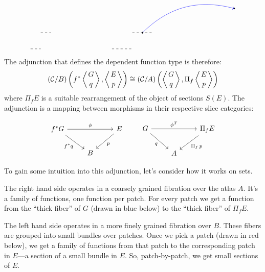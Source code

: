 \documentclass[DaoFP]{subfiles}
\begin{document}
\[\begin{tikzpicture}
\filldraw[black] (\xl + 3 * \dx, \yb + 5* \dy) circle (1 pt);
\filldraw[black] (\xr + 3 * \dx, \yb + 8* \dy) circle (1 pt);

\draw[blue] ((\xl + 3 * \dx, \yb + 5* \dy) edge[->, bend left] (\xr + 3 * \dx, \yb + 8* \dy);

\draw[dashed] (\xl, \yb + 3* \dy) -- (\xl + 2 * \dx, \yb + 3* \dy);
\draw[dashed] (\xl + 2 * \dx, \yb + 5* \dy) -- (\xl + 4* \dx, \yb + 5* \dy);

\draw[dashed] (\xmin, \yb + 3* \dy) -- (\xmin + \dx, \yb + 3* \dy);
\draw[dashed] (\xmin + \dx, \yb + 5* \dy) -- (\xmin + 2 * \dx, \yb + 5* \dy);

\end{tikzpicture}
\]

The adjunction that defines the dependent function type is therefore:
\[ (\mathcal{C}/B) \left( f^* \left \langle {G \atop q} \right \rangle, \left \langle {E \atop p} \right \rangle \right) \cong  (\mathcal{C}/A)\left( \left \langle {G \atop q} \right \rangle, \Pi_f \left \langle {E \atop p } \right \rangle \right) \]
where $\Pi_f E$ is a suitable rearrangement of the object of sections $S(E)$. The adjunction is a mapping between morphisms in their respective slice categories:

\[
 \begin{tikzcd}
 f^* G
 \arrow[rr, "\phi"]
 \arrow[rd, "f^* q"']
 &&E
 \arrow[dl, "p"]
 \\
 &B
 \end{tikzcd}
 \hspace{20pt}
\begin{tikzcd}
 G
 \arrow[rr, "\phi^T"]
 \arrow[rd, "q"']
 && \Pi_f E
 \arrow[ld, "\Pi_f \, p"]
 \\
 & A
  \end{tikzcd}
\]

To gain some intuition into this adjunction, let's consider how it works on sets. 

The right hand side operates in a coarsely grained fibration over the atlas $A$. It's a family of functions, one function per patch. For every patch we get a function from the ``thick fiber'' of $G$ (drawn in blue below) to the ``thick fiber'' of $\Pi_f E$.

The left hand side operates in a more finely grained fibration over $B$. These fibers are grouped into small bundles over patches. Once we pick a patch (drawn in red below), we get a family of functions from that patch to the corresponding patch in $E$---a section of a small bundle in $E$. So, patch-by-patch, we get small sections of $E$. 
\end{document}
